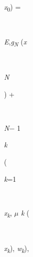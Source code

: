 \documentclass[12pt,twoside]{article}
\begin{document}
\begin{FlushLeft}
\\
{\fontsize{10pt}{12.0pt}\selectfont \textit{x}\textsubscript{0}) =\par}
\end{FlushLeft}\par

\begin{FlushLeft}
\\
{\fontsize{10pt}{12.0pt}\selectfont \textit{E},\textit{g\textsubscript{N} }(\textit{x}\par}
\end{FlushLeft}\par

\begin{FlushLeft}
\\
{\fontsize{7pt}{8.4pt}\selectfont \textit{N }{\fontsize{10pt}{12.0pt}\selectfont ) +\par}\par}
\end{FlushLeft}\par

\begin{FlushLeft}
\\
{\fontsize{7pt}{8.4pt}\selectfont \textit{N}$-$ 1\par}
\end{FlushLeft}\par

\begin{FlushRight}
{\fontsize{7pt}{8.4pt}\selectfont \textit{k }{\fontsize{10pt}{12.0pt}\selectfont (\par}\par}
\end{FlushRight}\par

\begin{FlushLeft}
{\fontsize{7pt}{8.4pt}\selectfont \textit{k}=1\par}
\end{FlushLeft}\par

\begin{FlushLeft}
\\
{\fontsize{10pt}{12.0pt}\selectfont \textit{x\textsubscript{k}}, \textit{$ \mu $ k }(\par}
\end{FlushLeft}\par

\begin{FlushLeft}
\\
{\fontsize{10pt}{12.0pt}\selectfont \textit{x\textsubscript{k}}), \textit{w\textsubscript{k}}),\par}
\end{FlushLeft}\par
\end{document}

